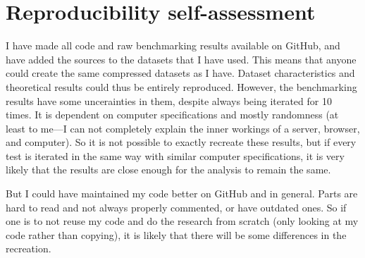 

\chapter{Reproducibility self-assessment}
I have made all code and raw benchmarking results available on GitHub, and have added the sources to the datasets that I have used.
This means that anyone could create the same compressed datasets as I have.
Dataset characteristics and theoretical results could thus be entirely reproduced.
However, the benchmarking results have some uncerainties in them, despite always being iterated for 10 times.
It is dependent on computer specifications and mostly randomness (at least to me---I can not completely explain the inner workings of a server, browser, and computer).
So it is not possible to exactly recreate these results, but if every test is iterated in the same way with similar computer specifications, it is very likely that the results are close enough for the analysis to remain the same.

But I could have maintained my code better on GitHub and in general.
Parts are hard to read and not always properly commented, or have outdated ones.
So if one is to not reuse my code and do the research from scratch (only looking at my code rather than copying), it is likely that there will be some differences in the recreation.
